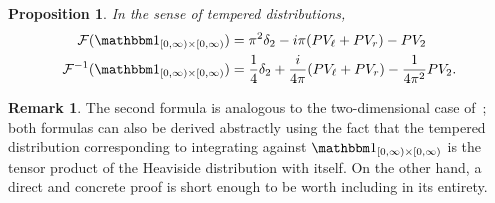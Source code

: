 \documentclass[11pt]{article}
\theoremstyle{plain}
\newtheorem{prop}[thm]{Proposition}
\theoremstyle{definition}
\newtheorem{rem}[thm]{Remark}
\numberwithin{equation}{section}
\newcommand{\0}{{\vec 0}}
\begin{document}
\begin{prop} \label{proposition fourier inverse indicator function}
In the sense of tempered distributions,
\begin{align*}
\mathcal{F}(\mathbbm1_{[0,\infty)\times[0,\infty)}) &= \pi^2\delta_2 - i\pi(PV_\ell+PV_r)-PV_2 \\
\mathcal{F}^{-1}(\mathbbm1_{[0,\infty)\times[0,\infty)}) &= \frac1{4}\delta_2+\frac{i}{4\pi}(PV_\ell+PV_r)-\frac1{4\pi^2}PV_2.
\end{align*}
\end{prop}

\begin{rem}
The second formula is analogous to the two-dimensional case of~\cite[Theorem~4]{BSRPNR}; both formulas can also be derived abstractly using the fact that the tempered distribution corresponding to integrating against $\mathbbm1_{[0,\infty)\times[0,\infty)}$ is the tensor product of the Heaviside distribution with itself. On the other hand, a direct and concrete proof is short enough to be worth including in its entirety.
\end{rem}
\end{document}
